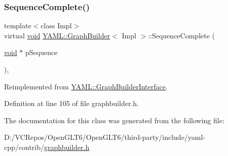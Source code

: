 \subsubsection{\texorpdfstring{SequenceComplete()}{SequenceComplete()}}
{\footnotesize\ttfamily template$<$class Impl$>$ \\
virtual \mbox{\hyperlink{glad_8h_a950fc91edb4504f62f1c577bf4727c29}{void}} \mbox{\hyperlink{class_y_a_m_l_1_1_graph_builder}{Y\+A\+M\+L\+::\+Graph\+Builder}}$<$ Impl $>$\+::Sequence\+Complete (\begin{DoxyParamCaption}\item[{\mbox{\hyperlink{glad_8h_a950fc91edb4504f62f1c577bf4727c29}{void}} $\ast$}]{p\+Sequence }\end{DoxyParamCaption})\hspace{0.3cm}{\ttfamily [inline]}, {\ttfamily [virtual]}}



Reimplemented from \mbox{\hyperlink{class_y_a_m_l_1_1_graph_builder_interface_a4e27895405da48ca9e67a3636f4cbd03}{Y\+A\+M\+L\+::\+Graph\+Builder\+Interface}}.



Definition at line 105 of file graphbuilder.\+h.



The documentation for this class was generated from the following file\+:\begin{DoxyCompactItemize}
\item 
D\+:/\+V\+C\+Repos/\+Open\+G\+L\+T6/\+Open\+G\+L\+T6/third-\/party/include/yaml-\/cpp/contrib/\mbox{\hyperlink{graphbuilder_8h}{graphbuilder.\+h}}\end{DoxyCompactItemize}
